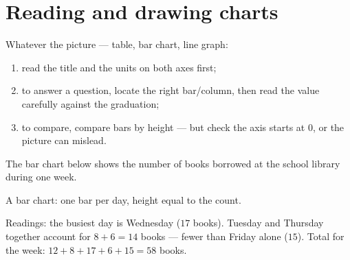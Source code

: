 \section{Reading and drawing charts}

\begin{method}\label{met:g6:propdata:read}
Whatever the picture --- table, bar chart, line graph:
\begin{enumerate}
  \item read the title and the units on both axes first;
  \item to answer a question, locate the right bar/column, then read
        the value carefully against the graduation;
  \item to compare, compare bars by height --- but check the axis
        starts at $0$, or the picture can mislead.
\end{enumerate}
\end{method}

\begin{example}\label{ex:g6:propdata:chart}
The bar chart below shows the number of books borrowed at the school
library during one week.

\begin{omfigure}

{\small A bar chart: one bar per day, height equal to the count.}
\end{omfigure}

Readings: the busiest day is Wednesday ($17$ books). Tuesday and
Thursday together account for $8 + 6 = 14$ books --- fewer than Friday
alone ($15$). Total for the week:
$12 + 8 + 17 + 6 + 15 = 58$ books.
\end{example}


